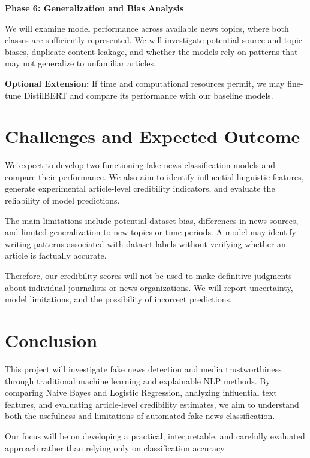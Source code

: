 \documentclass[conference]{IEEEtran}
\begin{document}
\textbf{Phase 6: Generalization and Bias Analysis}\par
We will examine model performance across available news topics, where both classes are sufficiently represented. We will investigate potential source and topic biases, duplicate-content leakage, and whether the models rely on patterns that may not generalize to unfamiliar articles.\par
\textbf{Optional Extension:} If time and computational resources permit, we may fine-tune DistilBERT and compare its performance with our baseline models.\par
\section{Challenges and Expected Outcome}
We expect to develop two functioning fake news classification models and compare their performance. We also aim to identify influential linguistic features, generate experimental article-level credibility indicators, and evaluate the reliability of model predictions.\par
The main limitations include potential dataset bias, differences in news sources, and limited generalization to new topics or time periods. A model may identify writing patterns associated with dataset labels without verifying whether an article is factually accurate.\par
Therefore, our credibility scores will not be used to make definitive judgments about individual journalists or news organizations. We will report uncertainty, model limitations, and the possibility of incorrect predictions.\par
\section{Conclusion}
This project will investigate fake news detection and media trustworthiness through traditional machine learning and explainable NLP methods. By comparing Naive Bayes and Logistic Regression, analyzing influential text features, and evaluating article-level credibility estimates, we aim to understand both the usefulness and limitations of automated fake news classification.\par
Our focus will be on developing a practical, interpretable, and carefully evaluated approach rather than relying only on classification accuracy.\par



\end{document}
